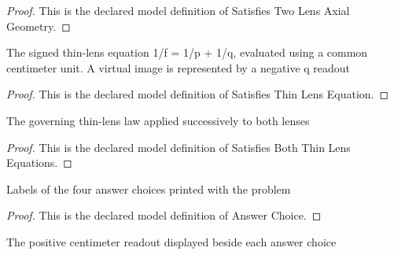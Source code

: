 \begin{proof}
  This is the declared model definition of Satisfies Two Lens Axial Geometry.
\end{proof}
\begin{definition}
  \label{def:physics:phyx-mini-0031:phyxminiproblems-problemphyxmini0031-satisfiesthinlensequation}
  The signed thin-lens equation 1/f = 1/p + 1/q, evaluated using a common centimeter unit. A virtual image is represented by a negative q readout
\end{definition}
\begin{proof}
  This is the declared model definition of Satisfies Thin Lens Equation.
\end{proof}
\begin{definition}
  \label{def:physics:phyx-mini-0031:phyxminiproblems-problemphyxmini0031-satisfiesboththinlensequations}
  The governing thin-lens law applied successively to both lenses
\end{definition}
\begin{proof}
  This is the declared model definition of Satisfies Both Thin Lens Equations.
\end{proof}
\begin{definition}
  \label{def:physics:phyx-mini-0031:phyxminiproblems-problemphyxmini0031-answerchoice}
  Labels of the four answer choices printed with the problem
\end{definition}
\begin{proof}
  This is the declared model definition of Answer Choice.
\end{proof}
\begin{definition}
  \label{def:physics:phyx-mini-0031:phyxminiproblems-problemphyxmini0031-answerdistanceincentimeters}
  The positive centimeter readout displayed beside each answer choice
\end{definition}
